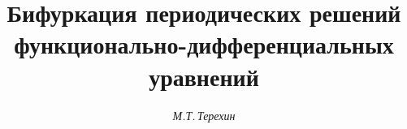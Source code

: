 

 




 


\newcommand{\Colon}{\operatorname{colon}} 


\newcommand{\diag}{\operatorname{diag}} 


\newcommand{\tts}[1]{} 


 




  


\setcounter{page}{37} 












\author{\it М.Т.\,Терехин} 




\title{Бифуркация периодических решений\\ 


функционально-дифференциальных уравнений} 


 


\date{} 




\pagestyle{plain} %


 




\maketitle 


